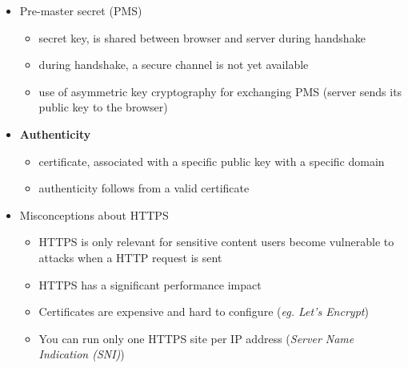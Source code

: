 \documentclass[12pt,titlepage,a4paper]{report}
\begin{document}
\begin{itemize}
		\item Pre-master secret (PMS)
		\begin{itemize}
			\item secret key, is shared between browser and server during handshake
			\item during handshake, a secure channel is not yet available
			\item use of asymmetric key cryptography for exchanging PMS (server sends its public key to the browser)
		\end{itemize}
	
		\item \textbf{Authenticity}
		\begin{itemize}
			\item certificate, associated with a specific public key with a specific domain
			\item authenticity follows from a valid certificate
		\end{itemize}
	
		\item Misconceptions about HTTPS
		\begin{itemize}
			\item HTTPS is only relevant for sensitive content 
				\subitem users become vulnerable to attacks when a HTTP request is sent
			\item HTTPS has a significant performance impact
			\item Certificates are expensive and hard to configure (\emph{eg. Let's Encrypt})
			\item You can run only one HTTPS site per IP address (\emph{Server Name Indication (SNI)})
		\end{itemize}
	\end{itemize}
\end{document}
